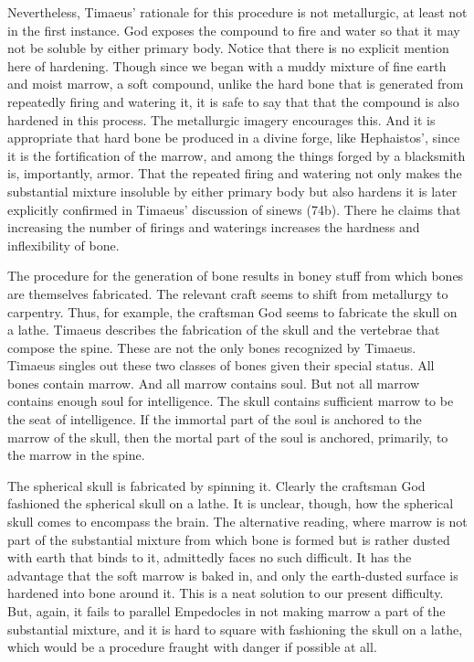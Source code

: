 Nevertheless, Timaeus' rationale for this procedure is not metallurgic, at least not in the first instance. God exposes the compound to fire and water so that it may not be soluble by either primary body. Notice that there is no explicit mention here of hardening. Though since we began with a muddy mixture of fine earth and moist marrow, a soft compound, unlike the hard bone that is generated from repeatedly firing and watering it, it is safe to say that that the compound is also hardened in this process. The metallurgic imagery encourages this. And it is appropriate that hard bone be produced in a divine forge, like Hephaistos', since it is the fortification of the marrow, and among the things forged by a blacksmith is, importantly, armor. That the repeated firing and watering not only makes the substantial mixture insoluble by either primary body but also hardens it is later explicitly confirmed in Timaeus' discussion of sinews (74b). There he claims that increasing the number of firings and waterings increases the hardness and inflexibility of bone.

The procedure for the generation of bone results in boney stuff from which bones are themselves fabricated. The relevant craft seems to shift from metallurgy to carpentry. Thus, for example, the craftsman God seems to fabricate the skull on a lathe. Timaeus describes the fabrication of the skull and the vertebrae that compose the spine. These are not the only bones recognized by Timaeus. Timaeus singles out these two classes of bones given their special status. All bones contain marrow. And all marrow contains soul. But not all marrow contains enough soul for intelligence. The skull contains sufficient marrow to be the seat of intelligence. If the immortal part of the soul is anchored to the marrow of the skull, then the mortal part of the soul is anchored, primarily, to the marrow in the spine.

The spherical skull is fabricated by spinning it. Clearly the craftsman God fashioned the spherical skull on a lathe. It is unclear, though, how the spherical skull comes to encompass the brain. The alternative reading, where marrow is not part of the substantial mixture from which bone is formed but is rather dusted with earth that binds to it, admittedly faces no such difficult. It has the advantage that the soft marrow is baked in, and only the earth-dusted surface is hardened into bone around it. This is a neat solution to our present difficulty. But, again, it fails to parallel Empedocles in not making marrow a part of the substantial mixture, and it is hard to square with fashioning the skull on a lathe, which would be a procedure fraught with danger if possible at all.

